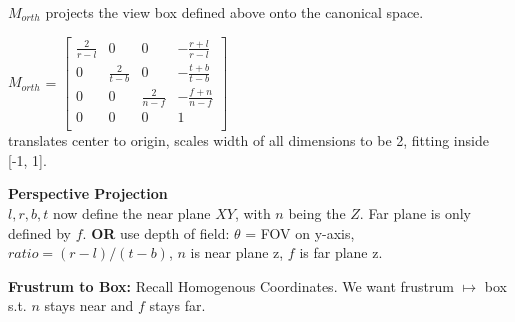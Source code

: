 \documentclass[letterpaper, 8pt]{extarticle}
\begin{document}
\begin{multicols*}{4}
    $M_{orth}$ projects the view box defined above onto the canonical space.


    $M_{orth}$ =
    \(
    \begin{bmatrix}
        \frac{2}{r-l} & 0             & 0             & -\frac{r+l}{r-l} \\
        0             & \frac{2}{t-b} & 0             & -\frac{t+b}{t-b} \\
        0             & 0             & \frac{2}{n-f} & -\frac{f+n}{n-f} \\
        0             & 0             & 0             & 1                \\
    \end{bmatrix}
    \)\\
    translates center to origin, scales width of all dimensions to be 2, fitting inside [-1, 1].

    \textbf{Perspective Projection}\\
    $l,r,b,t$ now define the near plane $XY$, with $n$ being the $Z$. Far plane is only defined by $f$.
    \textbf{OR} use depth of field:
    $\theta$ = FOV on y-axis, $ratio = (r-l)/(t-b)$, $n$ is near plane z, $f$ is far plane z.

    \textbf{Frustrum to Box:}
    Recall Homogenous Coordinates. We want frustrum $\mapsto$ box s.t. $n$ stays near and $f$ stays far.


\end{multicols*}
\end{document}
